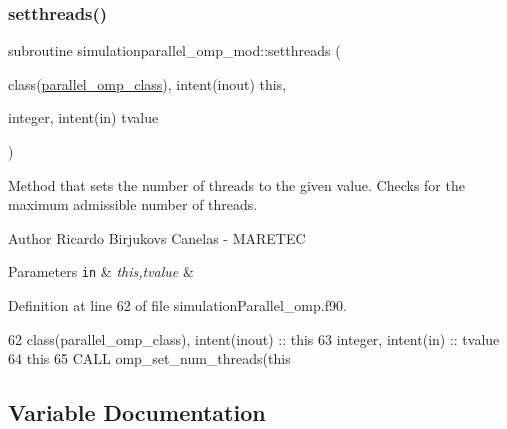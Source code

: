\subsubsection{\texorpdfstring{setthreads()}{setthreads()}}
{\footnotesize\ttfamily subroutine simulationparallel\+\_\+omp\+\_\+mod\+::setthreads (\begin{DoxyParamCaption}\item[{class(\mbox{\hyperlink{structsimulationparallel__omp__mod_1_1parallel__omp__class}{parallel\+\_\+omp\+\_\+class}}), intent(inout)}]{this,  }\item[{integer, intent(in)}]{tvalue }\end{DoxyParamCaption})\hspace{0.3cm}{\ttfamily [private]}}



Method that sets the number of threads to the given value. Checks for the maximum admissible number of threads. 

\begin{DoxyAuthor}{Author}
Ricardo Birjukovs Canelas -\/ M\+A\+R\+E\+T\+EC 
\end{DoxyAuthor}

\begin{DoxyParams}[1]{Parameters}
\mbox{\tt in}  & {\em this,tvalue} & \\
\hline
\end{DoxyParams}


Definition at line 62 of file simulation\+Parallel\+\_\+omp.\+f90.


\begin{DoxyCode}
62     \textcolor{keywordtype}{class}(parallel\_omp\_class), \textcolor{keywordtype}{intent(inout)} :: this
63     \textcolor{keywordtype}{integer}, \textcolor{keywordtype}{intent(in)} :: tvalue
64     this%
65     \textcolor{keyword}{CALL }omp\_set\_num\_threads(this%
\end{DoxyCode}


\subsection{Variable Documentation}
\mbox{\label{namespacesimulationparallel__omp__mod_abc49bae2a6d752c9868b8b7bd233e740}} 
